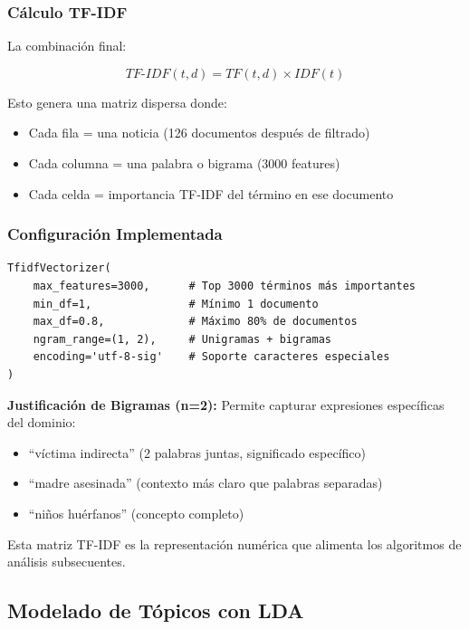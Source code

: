 \subsubsection{Cálculo TF-IDF}
\label{subsubsec:calculo_tfidf}

La combinación final:

\begin{equation}
TF\text{-}IDF(t,d) = TF(t,d) \times IDF(t)
\end{equation}

Esto genera una matriz dispersa donde:
\begin{itemize}
    \item Cada fila = una noticia (126 documentos después de filtrado)
    \item Cada columna = una palabra o bigrama (3000 features)
    \item Cada celda = importancia TF-IDF del término en ese documento
\end{itemize}

\subsubsection{Configuración Implementada}
\label{subsubsec:config_tfidf}

\begin{verbatim}
TfidfVectorizer(
    max_features=3000,      # Top 3000 términos más importantes
    min_df=1,               # Mínimo 1 documento
    max_df=0.8,             # Máximo 80% de documentos
    ngram_range=(1, 2),     # Unigramas + bigramas
    encoding='utf-8-sig'    # Soporte caracteres especiales
)
\end{verbatim}

\textbf{Justificación de Bigramas (n=2):} Permite capturar expresiones específicas del dominio:
\begin{itemize}
    \item ``víctima indirecta'' (2 palabras juntas, significado específico)
    \item ``madre asesinada'' (contexto más claro que palabras separadas)
    \item ``niños huérfanos'' (concepto completo)
\end{itemize}

Esta matriz TF-IDF es la representación numérica que alimenta los algoritmos de análisis subsecuentes.

\subsection{Modelado de Tópicos con LDA}
\label{subsec:lda}

